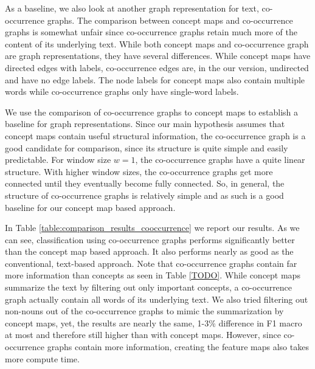 
As a baseline, we also look at another graph representation for text, co-occurrence graphs.
The comparison between concept maps and co-occurrence graphs is somewhat unfair since co-occurrence graphs retain much more of the content of its underlying text.
While both concept maps and co-occurrence graph are graph representations, they have several differences. While concept maps have directed edges with labels, co-occurrence edges are, in the our version, undirected and have no edge labels.
The node labels for concept maps also contain multiple words while co-occurrence graphs only have single-word labels.

We use the comparison of co-occurrence graphs to concept maps to establish a baseline for graph representations.
Since our main hypothesis assumes that concept maps contain useful structural information, the co-occurrence graph is a good candidate for comparison, since its structure is quite simple and easily predictable.
For window size $w=1$, the co-occurrence graphs have a quite linear structure. With higher window sizes, the co-occurrence graphs get more connected until they eventually become fully connected.
So, in general, the structure of co-occurrence graphs is relatively simple and as such is a good baseline for our concept map based approach.

In Table \ref{table:comparison_results_cooccurrence} we report our results.
As we can see, classification using co-occurrence graphs performs significantly better than the concept map based approach.
It also performs nearly as good as the conventional, text-based approach.
Note that co-occurrence graphs contain far more information than concepts as seen in Table \ref{TODO}.
While concept maps summarize the text by filtering out only important concepts, a co-occurrence graph actually contain all words of its underlying text.
We also tried filtering out non-nouns out of the co-occurrence graphs to mimic the summarization by concept maps, yet, the results are nearly the same, 1-3\% difference in F1 macro at most and therefore still higher than with concept maps.
However, since co-occurrence graphs contain more information, creating the feature maps also takes more compute time.

